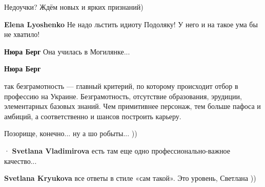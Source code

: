 \begin{itemize}
\begin{itemize}
 
Недоучки? Ждём новых и ярких признаний)

 
\textbf{Elena Lyoshenko} Не надо льстить идиоту Подоляку! У него и на такое ума бы не хватило!

 
\textbf{Нюра Берг} Она училась в Могилянке...

 
\textbf{Нюра Берг} 

так безграмотность — главный критерий, по которому происходит отбор в профессию
на Украине. Безграмотность, отсутствие образования, эрудиции, элементарных
базовых знаний. Чем примитивнее персонаж, тем больше пафоса и амбиций, а
соответственно и шансов построить карьеру.

Позорище, конечно... ну а шо робыты... ))

 
  · 
\textbf{Svetlana Vladimirova} есть там еще одно профессионально-важное качество...

 
\textbf{Svetlana Kryukova} все ответы в стиле «сам такой». Это уровень, Светлана ))


\end{itemize}
\end{itemize}
